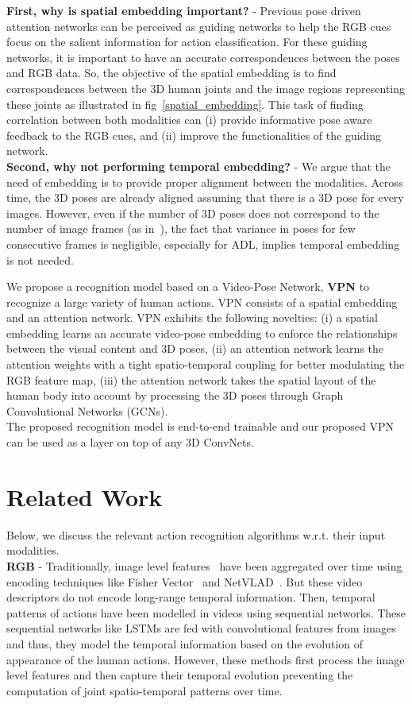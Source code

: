 \documentclass[runningheads]{llncs}
\begin{document}
\noindent\textbf{First, why is spatial embedding important?} - Previous pose driven attention networks can be perceived as guiding networks to help the RGB cues focus on the salient information for action classification. For these guiding networks, it is important to have an accurate correspondences between the poses and RGB data. So, the objective of the spatial embedding is to find correspondences between the 3D human joints and the image regions representing these joints as illustrated in fig~\ref{spatial_embedding}. This task of finding correlation between both modalities can (i) provide informative pose aware feedback to the RGB cues, and (ii) improve the functionalities of the guiding network. \\
\textbf{Second, why not performing temporal embedding?} - We argue that the need of embedding is to provide proper alignment between the modalities. Across time, the 3D poses are already aligned assuming that there is a 3D pose for every images. 
However, even if the number of 3D poses does not correspond to the number of image frames (as in~\cite{Baradel_BMVC,glimpse,STA-hands,spatial-i3d,STA_iccv}), the fact that variance in poses for few consecutive frames is negligible, especially for ADL, implies temporal embedding is not needed. 



 We propose a recognition model based on a Video-Pose Network, \textbf{VPN} to recognize a large variety of human actions. VPN consists of a spatial embedding and an attention network.
VPN exhibits the following novelties:
(i) a spatial embedding learns an accurate video-pose embedding to enforce the relationships between the visual content and 3D poses, (ii) an attention network learns the attention weights with a tight spatio-temporal coupling
for  better modulating the RGB feature map, (iii) the attention network takes the spatial layout of the human body into account by processing the 3D poses through Graph Convolutional Networks (GCNs). \\
The proposed recognition model is end-to-end trainable and our proposed VPN can be used as a layer on top of any 3D ConvNets.


 

\section{Related Work}
Below, we discuss the relevant action recognition algorithms w.r.t. their input modalities. \\
\textbf{RGB} - Traditionally, image level features~\cite{DT,IDT} have been aggregated over time using encoding techniques like Fisher Vector~\cite{fischer} and NetVLAD~\cite{NetVLAD}. But these video descriptors do not encode long-range temporal information. Then, temporal patterns of actions have been modelled in videos using sequential networks. These sequential networks like LSTMs are fed with convolutional features from images~\cite{lrcn} and thus, they model the temporal information based on the evolution of appearance of the human actions. However, these methods first process the image level features and then capture their temporal evolution preventing the computation of joint spatio-temporal patterns over time. 
\end{document}
